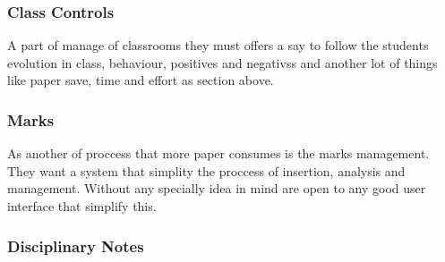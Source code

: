 \noindent{}




\bigskip
\subsubsection{Class Controls}
\bigskip

A part of manage of classrooms they must offers a say to follow the students evolution in class, behaviour, positives and negativss and another lot of things like paper save, time and effort as section above.

\bigskip
\subsubsection{Marks} %
\bigskip

As another of proccess that more paper consumes is the marks management. They want a system that simplity the proccess of insertion, analysis and management. Without any specially idea in mind are open to any good user interface that simplify this.


\bigskip
\subsubsection{Disciplinary Notes}
\bigskip

